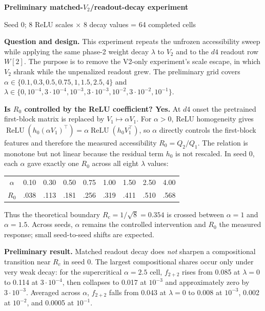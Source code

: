 \documentclass[10pt]{article}
\begin{document}
\begin{center}
{\Large\bfseries Preliminary matched-$V_2$/readout-decay experiment}\par\vspace{-1pt}
{\small Seed 0; 8 ReLU scales $\times$ 8 decay values = 64 completed cells}
\end{center}
\vspace{-4pt}

\textbf{Question and design.}
This experiment repeats the unfrozen accessibility sweep while applying the same phase-2
weight decay $\lambda$ to $V_2$ and to the $d4$ readout row $W[2]$.  The purpose is to remove
the V2-only experiment's scale escape, in which $V_2$ shrank while the unpenalized readout
grew.  The preliminary grid covers
$\alpha\in\{0.1,0.3,0.5,0.75,1,1.5,2.5,4\}$ and
$\lambda\in\{0,10^{-4},3\!\cdot\!10^{-4},10^{-3},3\!\cdot\!10^{-3},10^{-2},
3\!\cdot\!10^{-2},10^{-1}\}$.

\textbf{Is $R_0$ controlled by the ReLU coefficient?  Yes.}
At $d4$ onset the pretrained first-block matrix is replaced by $V_1\mapsto\alpha V_1$.
For $\alpha>0$, ReLU homogeneity gives
$\operatorname{ReLU}(h_0(\alpha V_1)^\top)=
\alpha\operatorname{ReLU}(h_0V_1^\top)$, so $\alpha$ directly controls the first-block
features and therefore the measured accessibility $R_0=Q_2/Q_1$.  The relation is monotone
but not linear because the residual term $h_0$ is not rescaled.  In seed 0, each $\alpha$
gave exactly one $R_0$ across all eight $\lambda$ values:

\vspace{-2pt}
\begin{center}\small
\begin{tabular}{@{}c rrrrrrrr@{}}
\toprule
$\alpha$ & 0.10 & 0.30 & 0.50 & 0.75 & 1.00 & 1.50 & 2.50 & 4.00 \\
$R_0$    & .038 & .113 & .181 & .256 & .319 & .411 & .510 & .568 \\
\bottomrule
\end{tabular}
\end{center}
\vspace{-2pt}
Thus the theoretical boundary $R_c=1/\sqrt{8}=0.354$ is crossed between
$\alpha=1$ and $\alpha=1.5$.  Across seeds, $\alpha$ remains the controlled intervention and
$R_0$ the measured response; small seed-to-seed shifts are expected.

\textbf{Preliminary result.}
Matched readout decay does \emph{not} sharpen a compositional transition near $R_c$ in seed 0.
The largest compositional shares occur only under very weak decay: for the supercritical
$\alpha=2.5$ cell, $f_{2+2}$ rises from 0.085 at $\lambda=0$ to 0.114 at
$3\!\cdot\!10^{-4}$, then collapses to 0.017 at $10^{-3}$ and approximately zero by
$3\!\cdot\!10^{-3}$.  Averaged across $\alpha$, $f_{2+2}$ falls from 0.043 at $\lambda=0$
to 0.008 at $10^{-3}$, 0.002 at $10^{-2}$, and 0.0005 at $10^{-1}$.
\end{document}

